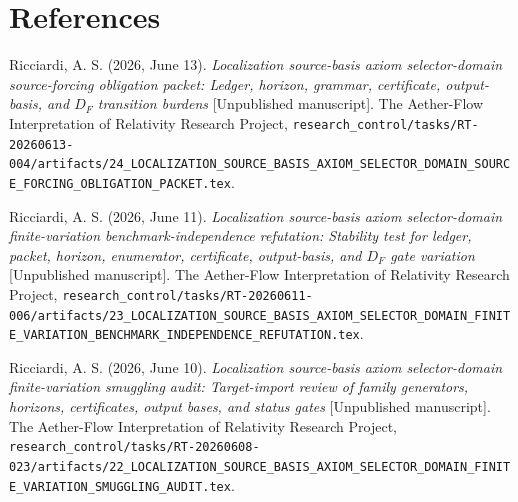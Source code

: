 \documentclass[11pt]{article}
\begin{document}
\section*{References}

Ricciardi, A. S. (2026, June 13). \emph{Localization source-basis axiom
selector-domain source-forcing obligation packet: Ledger, horizon, grammar,
certificate, output-basis, and \(D_F\) transition burdens} [Unpublished
manuscript]. The Aether-Flow Interpretation of Relativity Research Project,
\texttt{research\_control/tasks/RT-20260613-004/artifacts/24\_LOCALIZATION\_SOURCE\_BASIS\_AXIOM\_SELECTOR\_DOMAIN\_SOURCE\_FORCING\_OBLIGATION\_PACKET.tex}.

Ricciardi, A. S. (2026, June 11). \emph{Localization source-basis axiom
selector-domain finite-variation benchmark-independence refutation:
Stability test for ledger, packet, horizon, enumerator, certificate,
output-basis, and \(D_F\) gate variation} [Unpublished manuscript]. The
Aether-Flow Interpretation of Relativity Research Project,
\texttt{research\_control/tasks/RT-20260611-006/artifacts/23\_LOCALIZATION\_SOURCE\_BASIS\_AXIOM\_SELECTOR\_DOMAIN\_FINITE\_VARIATION\_BENCHMARK\_INDEPENDENCE\_REFUTATION.tex}.

Ricciardi, A. S. (2026, June 10). \emph{Localization source-basis axiom
selector-domain finite-variation smuggling audit: Target-import review of
family generators, horizons, certificates, output bases, and status gates}
[Unpublished manuscript]. The Aether-Flow Interpretation of Relativity
Research Project,
\texttt{research\_control/tasks/RT-20260608-023/artifacts/22\_LOCALIZATION\_SOURCE\_BASIS\_AXIOM\_SELECTOR\_DOMAIN\_FINITE\_VARIATION\_SMUGGLING\_AUDIT.tex}.
\end{document}
